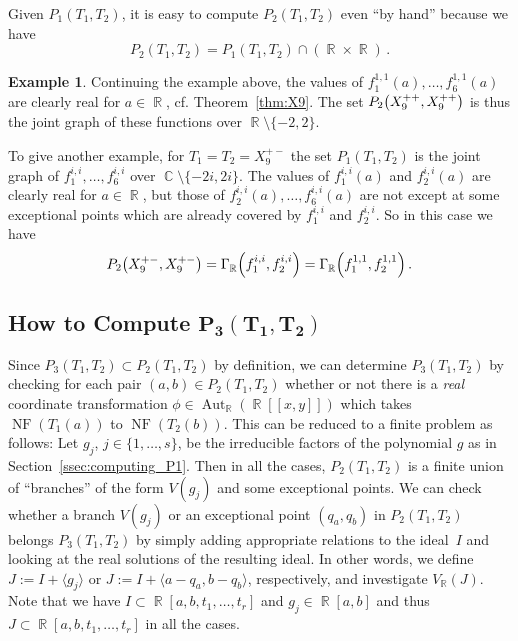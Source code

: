 \documentclass{amsproc}
\theoremstyle{definition}
\newtheorem{example}[theorem]{Example}
\let\originalleft\left
\let\originalright\right
\renewcommand{\left}{\mathopen{}\mathclose\bgroup\originalleft}
\renewcommand{\right}{\aftergroup\egroup\originalright}
\DeclareMathOperator{\R}{\mathbb{R}}
\DeclareMathOperator{\C}{\mathbb{C}}
\DeclareMathOperator{\NF}{NF}
\DeclareMathOperator{\Aut}{Aut}
\begin{document}
Given $P_1(T_1, T_2)$, it is easy to compute $P_2(T_1, T_2)$ even ``by hand''
because we have
\[
P_2(T_1, T_2) = P_1(T_1, T_2) \cap (\R \times \R) \,.
\]

\begin{example}\label{ex:P2}
Continuing the example above, the values of
$f_1^{1,1}(a), \ldots, f_6^{1,1}(a)$ are clearly real for $a \in \R$, cf.\@
Theorem~\ref{thm:X9}. The set $P_2\left(X_9^{++}, X_9^{++}\right)$ is thus the
joint graph of these functions over $\R \setminus \{-2, 2\}$.

To give another example, for $T_1 = T_2 = X_9^{+-}$ the set $P_1(T_1, T_2)$ is
the joint graph of $f_1^{i,i}, \ldots, f_6^{i,i}$ over
$\C \setminus \{-2i, 2i\}$. The values of $f_1^{i,i}(a)$ and $f_2^{i,i}(a)$ are
clearly real for $a \in \R$, but those of $f_2^{i,i}(a), \ldots, f_6^{i,i}(a)$
are not except at some exceptional points which are already covered by
$f_1^{i,i}$ and $f_2^{i,i}$. So in this case we have
\[
P_2\left(X_9^{+-}, X_9^{+-}\right)
= \Gamma_{\R} \left(f_1^{i,i}, f_2^{i,i}\right)
= \Gamma_{\R} \left(f_1^{1,1}, f_2^{1,1}\right) \,.
\]
\end{example}


\subsection{How to Compute $\boldsymbol{P_3(T_1, T_2)}$}%
\label{ssec:computing_P3}

Since $P_3(T_1, T_2) \subset P_2(T_1, T_2)$ by definition, we can determine
$P_3(T_1, T_2)$ by checking for each pair $(a,b) \in P_2(T_1, T_2)$ whether or
not there is a \emph{real} coordinate transformation
$\phi \in \Aut_{\R}(\R[[x,y]])$ which takes $\NF(T_1(a))$ to $\NF(T_2(b))$.
This can be reduced to a finite problem as follows: Let $g_j$, $j \in
\{1,\ldots,s\}$, be the irreducible factors of the polynomial $g$ as in
Section~\ref{ssec:computing_P1}. Then in all the cases, $P_2(T_1, T_2)$ is a
finite union of ``branches'' of the form $V(g_j)$ and some exceptional points.
We can check whether a branch $V(g_j)$ or an exceptional point $(q_a, q_b)$ in
$P_2(T_1, T_2)$ belongs $P_3(T_1, T_2)$ by simply adding appropriate relations
to the ideal~$I$ and looking at the real solutions of the resulting ideal. In
other words, we define $J := I+\langle g_j \rangle$ or
$J := I+\langle a-q_a, b-q_b \rangle$, respectively, and investigate
$V_{\R}(J)$. Note that we have $I \subset \R[a,b,t_1,\ldots,t_r]$ and
$g_j \in \R[a,b]$ and thus $J \subset \R[a,b,t_1,\ldots,t_r]$ in all the cases.
\end{document}

